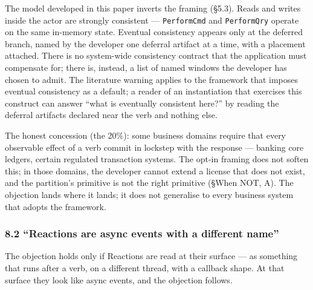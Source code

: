 \documentclass[
]{article}
\let\origtexttt\texttt%
\renewcommand{\texttt}[1]{\origtexttt{\seqsplit{#1}}}%
\let\texttt\origtexttt%
\begin{document}
The model developed in this paper inverts the framing (§5.3). Reads and
writes inside the actor are strongly consistent --- \texttt{PerformCmd}
and \texttt{PerformQry} operate on the same in-memory state. Eventual
consistency appears only at the deferred branch, named by the developer
one deferral artifact at a time, with a placement attached. There is no
system-wide consistency contract that the application must compensate
for; there is, instead, a list of named windows the developer has chosen
to admit. The literature warning applies to the framework that imposes
eventual consistency as a default; a reader of an instantiation that
exercises this construct can answer ``what is eventually consistent
here?'' by reading the deferral artifacts declared near the verb and
nothing else.

The honest concession (the 20\%): some business domains require that
every observable effect of a verb commit in lockstep with the response
--- banking core ledgers, certain regulated transaction systems. The
opt-in framing does not soften this; in those domains, the developer
cannot extend a license that does not exist, and the partition's
primitive is not the right primitive (§When NOT, A). The objection lands
where it lands; it does not generalise to every business system that
adopts the framework.

\subsubsection{8.2 ``Reactions are async events with a different
name''}\label{reactions-are-async-events-with-a-different-name}

The objection holds only if Reactions are read at their surface --- as
something that runs after a verb, on a different thread, with a callback
shape. At that surface they look like async events, and the objection
follows.
\end{document}
